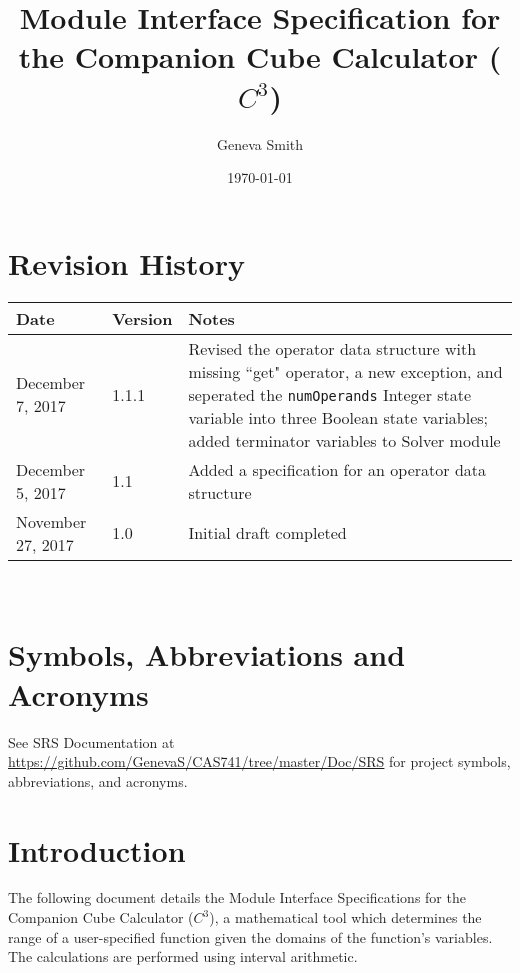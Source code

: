 \documentclass[12pt, titlepage]{article}
\newcommand{\progname}{Companion Cube Calculator}
\newcommand{\prognameAbbrv}{$C^{3}$}
\begin{document}
\title{Module Interface Specification for the \progname{} (\prognameAbbrv{})}

\author{Geneva Smith}

\date{\today}

\maketitle


\section{Revision History}

\begin{tabularx}{\textwidth}{p{3cm}p{2cm}X}
\toprule {\bf Date} & {\bf Version} & {\bf Notes}\\
\midrule
December 7, 2017 & 1.1.1 & Revised the operator data structure with missing 
``get" operator, a new exception, and seperated the \texttt{numOperands} 
Integer state variable into three Boolean state variables; added terminator 
variables to Solver module\\
December 5, 2017 & 1.1 & Added a specification for an operator data structure \\
November 27, 2017 & 1.0 & Initial draft completed\\
\bottomrule
\end{tabularx}

~\newpage

\section{Symbols, Abbreviations and Acronyms}

See SRS Documentation at 
\url{https://github.com/GenevaS/CAS741/tree/master/Doc/SRS} for project 
symbols, abbreviations, and acronyms.

\newpage

\tableofcontents

\newpage


\section{Introduction}

The following document details the Module Interface Specifications for the 
\progname{} (\prognameAbbrv{}), a mathematical tool which determines the range 
of a user-specified function given the domains of the function's variables. The 
calculations are performed using interval arithmetic.
\end{document}
